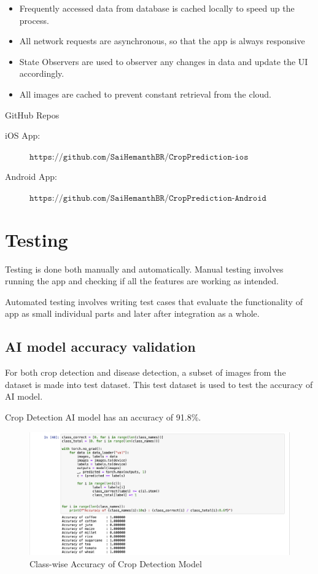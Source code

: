 \documentclass[../Report.tex]{subfiles}
\begin{document}
\begin{itemize}
  \item Frequently accessed data from database is cached locally to speed up the process.
  \item All network requests are asynchronous, so that the app is always responsive
  \item State Observers are used to observer any changes in data and update the UI accordingly.
  \item All images are cached to prevent constant retrieval from the cloud.
\end{itemize}

\noindent
GitHub Repos
\begin{description}
  \item [iOS App:] $\texttt{https://github.com/SaiHemanthBR/CropPrediction-ios}$
  \item[Android App:] $\texttt{https://github.com/SaiHemanthBR/CropPrediction-Android}$
\end{description}

\section{Testing}

Testing is done both manually and automatically. Manual testing involves running the app and checking if all the features are working as 
intended.\par
Automated testing involves writing test cases that evaluate the functionality of app as small individual parts and later after integration 
as a whole.

\subsection{AI model accuracy validation} \label{sec:ai_testing}

For both crop detection and disease detection, a subset of images from the dataset is made into test dataset. This test dataset is used to 
test the accuracy of AI model.\par

Crop Detection AI model has an accuracy of 91.8\%.
\begin{figure}[H]
  \centering
  \includegraphics[width=\linewidth]{images/crop_class_acc.png}
  \caption{Class-wise Accuracy of Crop Detection Model}
  \label{fig:test_ai_crop_class_acc}
\end{figure}\par
\end{document}
